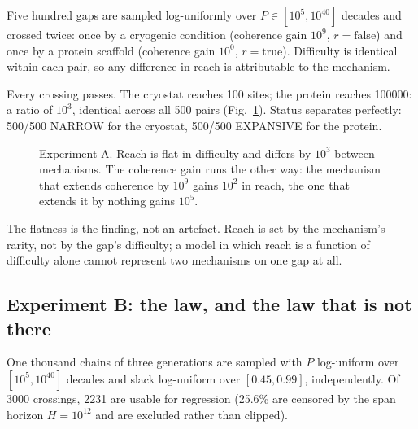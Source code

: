 \documentclass[conference]{IEEEtran}
\theoremstyle{definition}
\begin{document}
Five hundred gaps are sampled log-uniformly over $P\in[10^{5},10^{40}]$ decades and
crossed twice: once by a cryogenic condition (coherence gain $10^{9}$,
$r=\text{false}$) and once by a protein scaffold (coherence gain $10^{0}$,
$r=\text{true}$). Difficulty is identical within each pair, so any difference in
reach is attributable to the mechanism.

Every crossing passes. The cryostat reaches \num{100} sites; the protein reaches
\num{100000}: a ratio of $10^{3}$, identical across all 500 pairs
(Fig.~\ref{fig:ab}). Status separates perfectly: 500/500 NARROW for the cryostat,
500/500 EXPANSIVE for the protein.

\begin{figure}[t]
\centering
{}
\caption{Experiment A. Reach is flat in difficulty and differs by $10^{3}$ between
mechanisms. The coherence gain runs the other way: the mechanism that extends
coherence by $10^{9}$ gains $10^{2}$ in reach, the one that extends it by nothing
gains $10^{5}$.}
\label{fig:ab}
\end{figure}

The flatness is the finding, not an artefact. Reach is set by the mechanism's
rarity, not by the gap's difficulty; a model in which reach is a function of
difficulty alone cannot represent two mechanisms on one gap at all.

\subsection{Experiment B: the law, and the law that is not there}
\label{sec:law}

One thousand chains of three generations are sampled with $P$ log-uniform over
$[10^{5},10^{40}]$ decades and slack log-uniform over $[0.45,0.99]$, independently.
Of \num{3000} crossings, \num{2231} are usable for regression (\num{25.6}\% are
censored by the span horizon $H=10^{12}$ and are excluded rather than clipped).
\end{document}
